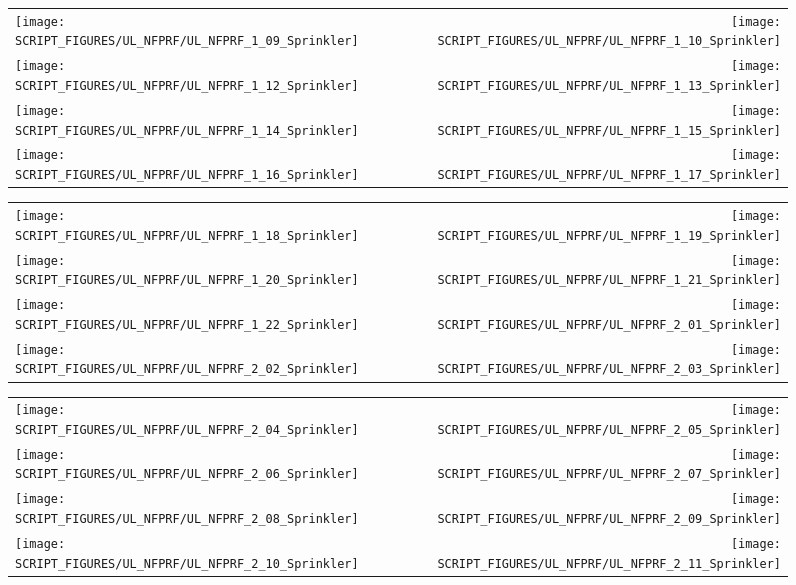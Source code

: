 \begin{figure}[!ht]
\begin{tabular*}{\textwidth}{l@{\extracolsep{\fill}}r}
\texttt{[image: SCRIPT\_FIGURES/UL\_NFPRF/UL\_NFPRF\_1\_09\_Sprinkler]} &
\texttt{[image: SCRIPT\_FIGURES/UL\_NFPRF/UL\_NFPRF\_1\_10\_Sprinkler]} \\
\texttt{[image: SCRIPT\_FIGURES/UL\_NFPRF/UL\_NFPRF\_1\_12\_Sprinkler]} &
\texttt{[image: SCRIPT\_FIGURES/UL\_NFPRF/UL\_NFPRF\_1\_13\_Sprinkler]} \\
\texttt{[image: SCRIPT\_FIGURES/UL\_NFPRF/UL\_NFPRF\_1\_14\_Sprinkler]} &
\texttt{[image: SCRIPT\_FIGURES/UL\_NFPRF/UL\_NFPRF\_1\_15\_Sprinkler]} \\
\texttt{[image: SCRIPT\_FIGURES/UL\_NFPRF/UL\_NFPRF\_1\_16\_Sprinkler]} &
\texttt{[image: SCRIPT\_FIGURES/UL\_NFPRF/UL\_NFPRF\_1\_17\_Sprinkler]}
\end{tabular*}
\end{figure}

\begin{figure}[!ht]
\begin{tabular*}{\textwidth}{l@{\extracolsep{\fill}}r}
\texttt{[image: SCRIPT\_FIGURES/UL\_NFPRF/UL\_NFPRF\_1\_18\_Sprinkler]} &
\texttt{[image: SCRIPT\_FIGURES/UL\_NFPRF/UL\_NFPRF\_1\_19\_Sprinkler]} \\
\texttt{[image: SCRIPT\_FIGURES/UL\_NFPRF/UL\_NFPRF\_1\_20\_Sprinkler]} &
\texttt{[image: SCRIPT\_FIGURES/UL\_NFPRF/UL\_NFPRF\_1\_21\_Sprinkler]} \\
\texttt{[image: SCRIPT\_FIGURES/UL\_NFPRF/UL\_NFPRF\_1\_22\_Sprinkler]} &
\texttt{[image: SCRIPT\_FIGURES/UL\_NFPRF/UL\_NFPRF\_2\_01\_Sprinkler]} \\
\texttt{[image: SCRIPT\_FIGURES/UL\_NFPRF/UL\_NFPRF\_2\_02\_Sprinkler]} &
\texttt{[image: SCRIPT\_FIGURES/UL\_NFPRF/UL\_NFPRF\_2\_03\_Sprinkler]}
\end{tabular*}
\end{figure}

\begin{figure}[!ht]
\begin{tabular*}{\textwidth}{l@{\extracolsep{\fill}}r}
\texttt{[image: SCRIPT\_FIGURES/UL\_NFPRF/UL\_NFPRF\_2\_04\_Sprinkler]} &
\texttt{[image: SCRIPT\_FIGURES/UL\_NFPRF/UL\_NFPRF\_2\_05\_Sprinkler]} \\
\texttt{[image: SCRIPT\_FIGURES/UL\_NFPRF/UL\_NFPRF\_2\_06\_Sprinkler]} &
\texttt{[image: SCRIPT\_FIGURES/UL\_NFPRF/UL\_NFPRF\_2\_07\_Sprinkler]} \\
\texttt{[image: SCRIPT\_FIGURES/UL\_NFPRF/UL\_NFPRF\_2\_08\_Sprinkler]} &
\texttt{[image: SCRIPT\_FIGURES/UL\_NFPRF/UL\_NFPRF\_2\_09\_Sprinkler]} \\
\texttt{[image: SCRIPT\_FIGURES/UL\_NFPRF/UL\_NFPRF\_2\_10\_Sprinkler]} &
\texttt{[image: SCRIPT\_FIGURES/UL\_NFPRF/UL\_NFPRF\_2\_11\_Sprinkler]}
\end{tabular*}
\end{figure}

